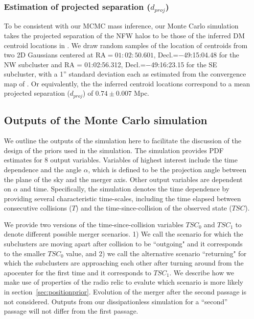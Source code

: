 \subsubsection{Estimation of projected separation ($d_{proj}$)} 
To be consistent with our MCMC mass inference, our Monte Carlo simulation takes 
the projected separation of the NFW halos to be those of the inferred
DM centroid locations in \citealt{Jee13}. We draw random samples
 of the location of centroids from two 2D Gaussians centered at
 RA$=01:02:50.601$, Decl.=$-$49:15:04.48 for the NW subcluster and RA =
 01:02:56.312, Decl.=$-$49:16:23.15 for the SE
subcluster, with a 1'' standard deviation each as estimated from the
convergence map of \citet{Jee13}. Or equivalently, the
the inferred centroid locations correspond to a mean projected separation
($d_{proj}$) of $0.74\pm {0.007}$ Mpc. 
\subsection{Outputs of the Monte Carlo simulation}\label{sec: outputs}
%

We outline the outputs of the simulation here to facilitate the discussion
of the design of the priors used in the simulation. The simulation
provides PDF estimates for 8 output variables. Variables
of highest interest include the time dependence and the angle $\alpha$, which is
defined to be the projection angle between the plane of the sky and the
merger axis. Other output variables are dependent on $\alpha$ and time. Specifically, the simulation denotes the time dependence by
providing several characteristic time-scales, including the time
elapsed between consecutive collisions
($T$) and the time-since-collision of the observed state ($TSC$).  

We provide two versions of the time-since-collision variables $TSC_0$ and
$TSC_1$ to denote different possible merger scenarios. 1) We call the scenario for which the subclusters are
moving apart after collision to be ``outgoing" and it corresponds to the
smaller $TSC_0$ value, and 2) we call the alternative scenario 
``returning" for which the subclusters are approaching each other after turning
around from the apocenter for the first time and it corresponds to $TSC_1$.
We describe how we make use of properties of the radio relic to evalute
which scenario is more likely in
section~\ref{sec:positionprior}. Evolution of the merger after the second
passage is not considered. Outputs from our dissipationless simulation for
a ``second'' passage will not differ from the first passage.
 
